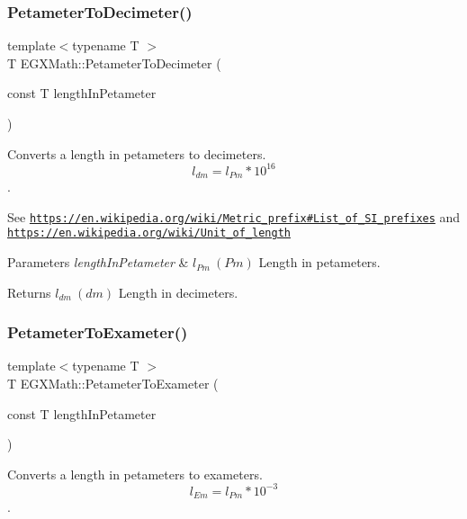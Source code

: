 \subsubsection{\texorpdfstring{Petameter\+To\+Decimeter()}{PetameterToDecimeter()}}
{\footnotesize\ttfamily template$<$typename T $>$ \\
T E\+G\+X\+Math\+::\+Petameter\+To\+Decimeter (\begin{DoxyParamCaption}\item[{const T}]{length\+In\+Petameter }\end{DoxyParamCaption})}



Converts a length in petameters to decimeters. \[ l_{dm}=l_{Pm} * 10^{16} \]. 

See \href{https://en.wikipedia.org/wiki/Metric_prefix#List_of_SI_prefixes}{\tt https\+://en.\+wikipedia.\+org/wiki/\+Metric\+\_\+prefix\#\+List\+\_\+of\+\_\+\+S\+I\+\_\+prefixes} and \href{https://en.wikipedia.org/wiki/Unit_of_length}{\tt https\+://en.\+wikipedia.\+org/wiki/\+Unit\+\_\+of\+\_\+length} 
\begin{DoxyParams}{Parameters}
{\em length\+In\+Petameter} & $ l_{Pm}\ (Pm)$ Length in petameters. \\
\hline
\end{DoxyParams}
\begin{DoxyReturn}{Returns}
$ l_{dm}\ (dm)$ Length in decimeters. 
\end{DoxyReturn}
\mbox{\label{group___e_g_x_math-_conversions-_length_conversions-_petameter-_s_i_gade75826e3cd26e484252c5d5a9d1bf8c}} 
\subsubsection{\texorpdfstring{Petameter\+To\+Exameter()}{PetameterToExameter()}}
{\footnotesize\ttfamily template$<$typename T $>$ \\
T E\+G\+X\+Math\+::\+Petameter\+To\+Exameter (\begin{DoxyParamCaption}\item[{const T}]{length\+In\+Petameter }\end{DoxyParamCaption})}



Converts a length in petameters to exameters. \[ l_{Em}=l_{Pm} * 10^{-3} \]. 

